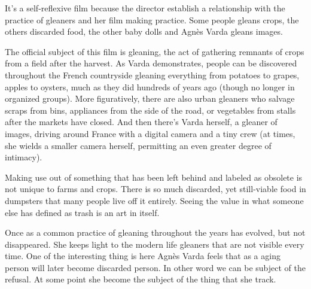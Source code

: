 It's a self-reflexive film because the director establish a relationship with the practice of gleaners and her film making practice. Some people gleans crops, the others discarded food, the other baby dolls and Agnès Varda gleans images.  


The official subject of this film is gleaning, the act of gathering remnants of crops from a field after the harvest. As Varda demonstrates, people can be discovered throughout the French countryside gleaning everything from potatoes to grapes, apples to oysters, much as they did hundreds of years ago (though no longer in organized groups). More figuratively, there are also urban gleaners who salvage scraps from bins, appliances from the side of the road, or vegetables from stalls after the markets have closed. And then there’s Varda herself, a gleaner of images, driving around France with a digital camera and a tiny crew (at times, she wields a smaller camera herself, permitting an even greater degree of intimacy).

Making use out of something that has been left behind and labeled as obsolete is not unique to farms and crops. There is so much discarded, yet still-viable food in dumpsters that many people live off it entirely. Seeing the value in what someone else has defined as trash is an art in itself.

Once as a common practice of gleaning throughout the years has evolved, but not disappeared. She keeps light to the modern life gleaners that are not visible every time. One of the interesting thing is here Agnès Varda feels that as a aging person will later become discarded person. In other word we can be subject of the refusal. At some point she become the subject of the thing that she track. 

